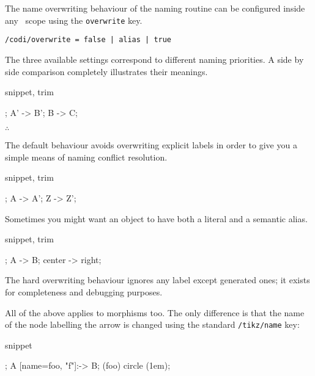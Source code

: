 The name overwriting behaviour of the naming routine can be configured
inside any \CoDi\ scope using the \lstinline!overwrite! key.

\begin{lstlisting}[style=metacode]
/codi/overwrite = false | alias | true
\end{lstlisting}

The three available settings correspond to different naming priorities.
A side by side comparison completely illustrates their meanings.

\begin{tcblisting}{snippet, trim}
\begin{codi}
; %
\mor A' -> B';
\mor B  -> C;
\end{codi}
\end{tcblisting}

\hfill$\therefore$\hfill\null

The default behaviour avoids overwriting explicit labels in order
to give you a simple means of naming conflict resolution.

\begin{tcblisting}{snippet, trim}
\begin{codi}[tetragonal]
;
\mor A -> A';
\mor Z -> Z';
\end{codi}
\end{tcblisting}

Sometimes you might want an object to have both a literal and a
semantic alias.

\begin{tcblisting}{snippet, trim}
\begin{codi}
;
\mor A -> B;
\mor center -> right;
\end{codi}
\end{tcblisting}

The hard overwriting behaviour ignores any label except generated
ones; it exists for completeness and debugging purposes.

All of the above applies to morphisms too.
The only difference is that the name of the node labelling the arrow is changed using the standard \lstinline|/tikz/name| key:

\begin{tcblisting}{snippet}
\begin{codi}
  ;
  \mor A [name=foo, "f"]:-> B;
  \draw [red] (foo) circle (1em);
\end{codi}
\end{tcblisting}
